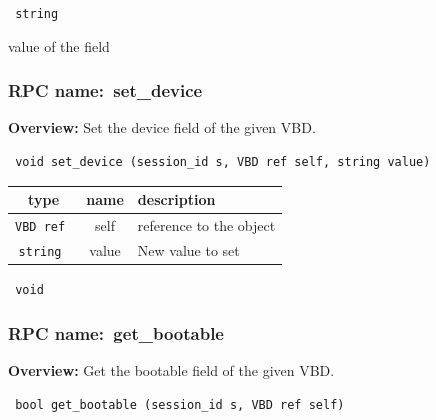 \vspace{0.3cm}

{\tt 
string
}


value of the field
\vspace{0.3cm}
\vspace{0.3cm}
\vspace{0.3cm}
\subsubsection{RPC name:~set\_device}

{\bf Overview:} 
Set the device field of the given VBD.

\begin{verbatim} void set_device (session_id s, VBD ref self, string value)\end{verbatim}



 
\vspace{0.3cm}
\begin{tabular}{|c|c|p{7cm}|}
 \hline
{\bf type} & {\bf name} & {\bf description} \\ \hline
{\tt VBD ref } & self & reference to the object \\ \hline 

{\tt string } & value & New value to set \\ \hline 

\end{tabular}

\vspace{0.3cm}

{\tt 
void
}



\vspace{0.3cm}
\vspace{0.3cm}
\vspace{0.3cm}
\subsubsection{RPC name:~get\_bootable}

{\bf Overview:} 
Get the bootable field of the given VBD.

\begin{verbatim} bool get_bootable (session_id s, VBD ref self)\end{verbatim}



